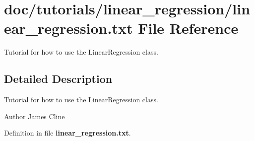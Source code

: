 \section{doc/tutorials/linear\-\_\-regression/linear\-\_\-regression.txt File Reference}
\label{linear__regression_8txt}


Tutorial for how to use the Linear\-Regression class.  




\subsection{Detailed Description}
Tutorial for how to use the Linear\-Regression class. \begin{DoxyAuthor}{Author}
James Cline 
\end{DoxyAuthor}


Definition in file {\bf linear\-\_\-regression.\-txt}.


